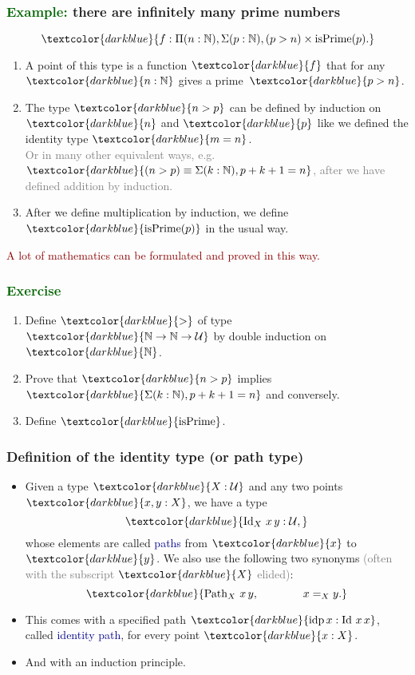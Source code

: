 \documentclass[aspectratio=169]{beamer}
\newcommand{\isPrime}{\operatorname{isPrime}}
\newcommand{\eqq}{\equiv}
\newcommand{\U}{\operatorname{\mathcal{U}}}
\newcommand{\db}{\textcolor{darkblue}}
\newcommand{\dg}{\textcolor{darkgreen}}
\newcommand{\grey}{\textcolor{grey}}
\newcommand{\dr}{\textcolor{darkred}}
\newcommand{\m}[1]{$\db{#1}$}
\newcommand{\M}[1]{\[\db{#1}\]}
\newcommand{\N}{\mathbb{N}}
\newcommand{\idp}{\operatorname{idp}}
\newcommand{\Id}{\operatorname{Id}}
\newcommand{\Path}{\operatorname{Path}}
\begin{document}
\begin{frame}
  \frametitle{\dg{Example:} there are infinitely many prime numbers}

\M{f : \Pi(n:\N), \Sigma(p:\N), (p > n) \times \isPrime(p).}


\begin{enumerate}
\vfill \item
A point of this type is a function \m{f} that for any \m{n:\N} gives a prime~\m{p > n}.

\vfill \item The type \m{n > p} can be defined by induction on \m{n} and \m{p} like we defined the identity type \m{m = n}. \\[1ex]

\grey{Or in many other equivalent ways, e.g. \m{(n > p) \eqq \Sigma(k : \N), p + k + 1 = n}, after we have defined addition by induction.}

\vfill \item After we define multiplication by induction, we define \m{\operatorname{isPrime}(p)} in the usual way.

\end{enumerate}
\vfill
\dr{A lot of mathematics can be formulated and proved in this way.}

\end{frame}

\begin{frame}
  \frametitle{\dg{Exercise}}

  \begin{enumerate}
  \item Define \m{>} of type \m{\N \to \N \to \U} by double induction on \m{\N}.
  \item Prove that \m{n > p} implies \m{\Sigma(k : \N), p + k + 1 = n} and conversely.
  \item Define \m{\operatorname{isPrime}}.
  \end{enumerate}

\end{frame}

\begin{frame}
  \frametitle{Definition of the identity type (or path type)}

  \begin{itemize}
    \vfill \item
    Given a type \m{X : \U} and any two points \m{x,y:X}, we have a type \M{\Id_X \, x \, y : \U,} whose
    elements are called \db{paths} from \m{x} to \m{y}.
    \vfill
    We also use the following two synonyms \grey{(often with the subscript \m{X} elided)}:
    \M{\Path_X \,x \,y, \qquad \qquad x =_X y.}
    \vfill \item
    This comes with a specified path \m{\idp x : \Id \, x \, x}, called \db{identity path}, for every point \m{x:X}.
    \vfill \item
    And with an induction principle.
  \end{itemize}

\end{frame}
\end{document}
